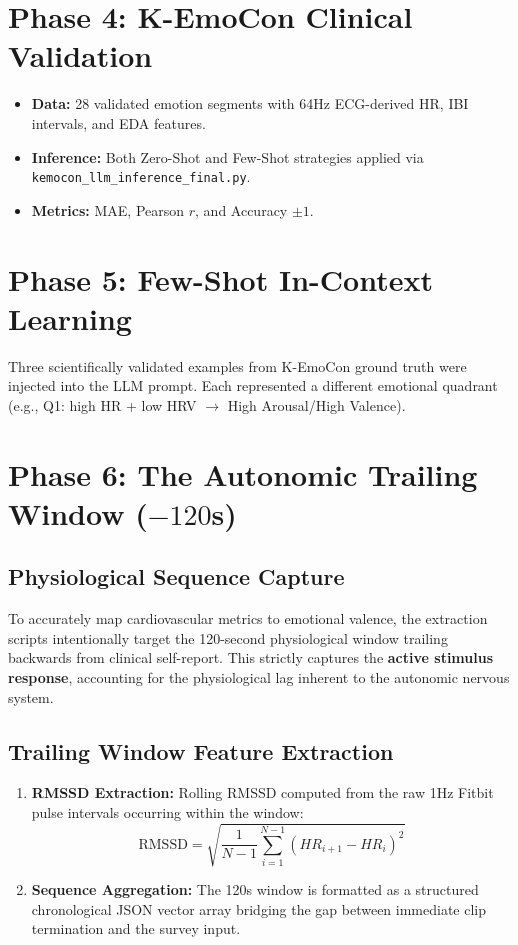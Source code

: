 \documentclass[11pt, a4paper]{report}
\begin{document}
\section{Phase 4: K-EmoCon Clinical Validation}
\begin{itemize}
    \item \textbf{Data:} 28 validated emotion segments with 64Hz ECG-derived HR, IBI intervals, and EDA features.
    \item \textbf{Inference:} Both Zero-Shot and Few-Shot strategies applied via \texttt{kemocon\_llm\_inference\_final.py}.
    \item \textbf{Metrics:} MAE, Pearson $r$, and Accuracy $\pm 1$.
\end{itemize}

\section{Phase 5: Few-Shot In-Context Learning}
Three scientifically validated examples from K-EmoCon ground truth were injected into the LLM prompt. Each represented a different emotional quadrant (e.g., Q1: high HR + low HRV $\rightarrow$ High Arousal/High Valence).

\section{Phase 6: The Autonomic Trailing Window ($-120$s)}

\subsection{Physiological Sequence Capture}
To accurately map cardiovascular metrics to emotional valence, the extraction scripts intentionally target the 120-second physiological window trailing backwards from clinical self-report. This strictly captures the \textbf{active stimulus response}, accounting for the physiological lag inherent to the autonomic nervous system.

\subsection{Trailing Window Feature Extraction}
\begin{enumerate}
    \item \textbf{RMSSD Extraction:} Rolling RMSSD computed from the raw 1Hz Fitbit pulse intervals occurring within the window:
    $$ \text{RMSSD} = \sqrt{\frac{1}{N-1}\sum_{i=1}^{N-1}(HR_{i+1} - HR_i)^2} $$
    \item \textbf{Sequence Aggregation:} The 120s window is formatted as a structured chronological JSON vector array bridging the gap between immediate clip termination and the survey input.
\end{enumerate}
\end{document}
